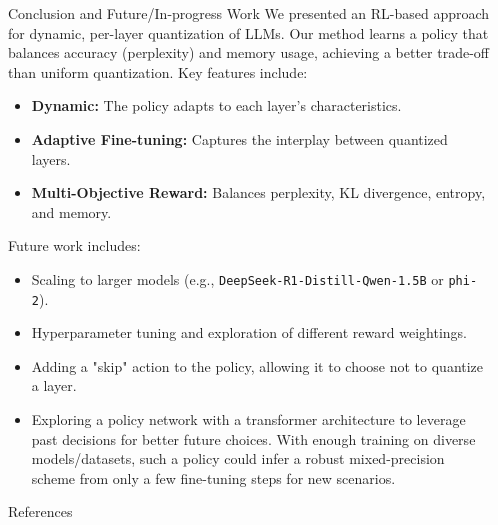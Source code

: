 \documentclass[final]{beamer}
\newlength{\sepwidth}
\newlength{\colwidth}
\newcommand{\separatorcolumn}{\begin{column}{\sepwidth}\end{column}}
\begin{document}
\begin{frame}[t]
\begin{columns}[t]
\begin{column}{\colwidth}
				\begin{block}{Conclusion and Future/In-progress Work}
					We presented an RL-based approach for dynamic, per-layer quantization of LLMs.  Our method learns a policy that balances accuracy (perplexity) and memory usage, achieving a better trade-off than uniform quantization.  Key features include:
					
					\begin{itemize}
						\item \textbf{Dynamic:}  The policy adapts to each layer's characteristics.
						\item \textbf{Adaptive Fine-tuning:} Captures the interplay between quantized layers.
						\item \textbf{Multi-Objective Reward:}  Balances perplexity, KL divergence, entropy, and memory.
					\end{itemize}
					
					Future work includes:
					\begin{itemize}
						\item Scaling to larger models (e.g., \texttt{DeepSeek-R1-Distill-Qwen-1.5B} or \texttt{phi-2}).
						\item Hyperparameter tuning and exploration of different reward weightings.
						\item Adding a "skip" action to the policy, allowing it to choose not to quantize a layer.
						\item Exploring a policy network with a transformer architecture to leverage past decisions for better future choices. With enough training on diverse models/datasets, such a policy could infer a robust mixed-precision scheme from only a few fine-tuning steps for new scenarios.
					\end{itemize}
				\end{block}
				
				\begin{block}{References}
					\balance					
					\printbibliography
				\end{block}
				
			\end{column}
			
			\separatorcolumn
		\end{columns}
	\end{frame}
	
\end{document}

